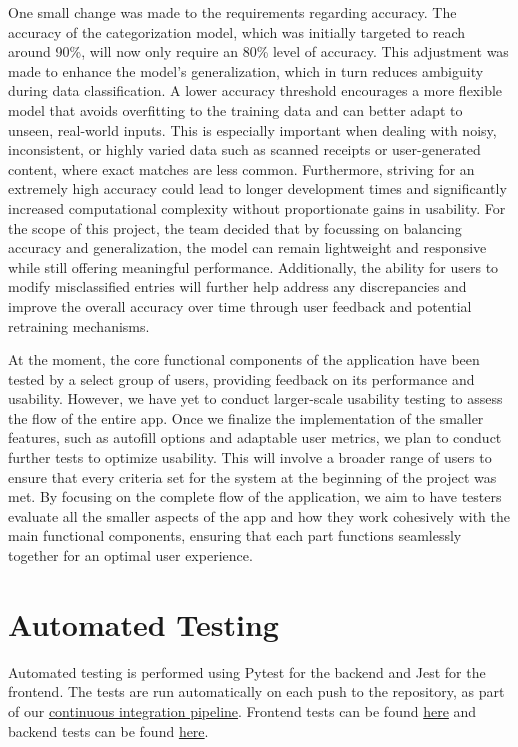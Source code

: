 \documentclass[12pt, titlepage]{article}
\begin{document}
One small change was made to the requirements regarding accuracy. The accuracy of the categorization model, 
which was initially targeted to reach around 90\%, will now only require an 80\% level of accuracy. 
This adjustment was made to enhance the model’s generalization, which in turn reduces ambiguity during data classification. 
A lower accuracy threshold encourages a more flexible model that avoids overfitting to the training data and can better adapt 
to unseen, real-world inputs. This is especially important when dealing with noisy, inconsistent, or highly varied data 
such as scanned receipts or user-generated content, where exact matches are less common. 
Furthermore, striving for an extremely high accuracy could lead to longer development times and significantly increased computational complexity 
without proportionate gains in usability. For the scope of this project, the team decided that by focussing on balancing accuracy and generalization, 
the model can remain lightweight and responsive while still offering meaningful performance. Additionally, the ability for users to modify 
misclassified entries will further help address any discrepancies and improve the overall accuracy 
over time through user feedback and potential retraining mechanisms.

At the moment, the core functional components of the application have been tested by a select group of users, providing feedback on its performance and usability. 
However, we have yet to conduct larger-scale usability testing to assess the flow of the entire app. Once we finalize the implementation of the smaller 
 features, such as autofill options and adaptable user metrics, we plan to conduct further tests to optimize usability. This will involve a broader range of users to ensure 
 that every criteria set for the system at the beginning of the project was met. By focusing on the complete flow of the application, we aim
to have testers evaluate all the smaller aspects of the app and how they work cohesively with the main functional components, ensuring that each part functions 
seamlessly together for an optimal user experience.

\section{Automated Testing}

Automated testing is performed using Pytest for the backend and Jest for the
frontend. The tests are run automatically on each push to the repository, as
part of our
\href{https://github.com/PlutosCapstone/Plutos/tree/main/.github/workflows}{continuous
integration pipeline}. Frontend tests can be found
\href{https://github.com/PlutosCapstone/Plutos/tree/main/src/client/tests}{here}
and backend tests can be found
\href{https://github.com/PlutosCapstone/Plutos/tree/main/src/server/tests}{here}.
\end{document}
